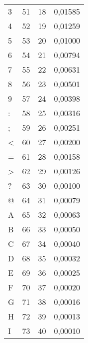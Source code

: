 \begin{table}[H]
{\begin{tabular}{@{}llll@{}}
    3               & 51                  & 18               & 0,01585          \\
    4               & 52                  & 19               & 0,01259          \\
    5               & 53                  & 20               & 0,01000          \\
    6               & 54                  & 21               & 0,00794          \\
    7               & 55                  & 22               & 0,00631          \\
    8               & 56                  & 23               & 0,00501          \\
    9               & 57                  & 24               & 0,00398          \\
    :               & 58                  & 25               & 0,00316          \\
    ;               & 59                  & 26               & 0,00251          \\
    \textless{}     & 60                  & 27               & 0,00200          \\
    =               & 61                  & 28               & 0,00158          \\
    \textgreater{}  & 62                  & 29               & 0,00126          \\
    ?               & 63                  & 30               & 0,00100          \\
    @               & 64                  & 31               & 0,00079          \\
    A               & 65                  & 32               & 0,00063          \\
    B               & 66                  & 33               & 0,00050          \\
    C               & 67                  & 34               & 0,00040          \\
    D               & 68                  & 35               & 0,00032          \\
    E               & 69                  & 36               & 0,00025          \\
    F               & 70                  & 37               & 0,00020          \\
    G               & 71                  & 38               & 0,00016          \\
    H               & 72                  & 39               & 0,00013          \\
    I               & 73                  & 40               & 0,00010          \\ \bottomrule
    \end{tabular}%
    }
    \end{table}

